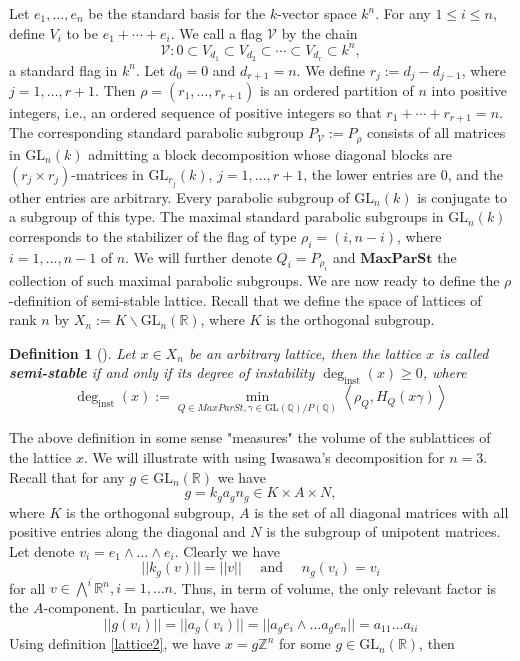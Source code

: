 \documentclass[12pt]{article} %
\newtheorem{definition}{Definition}[section]
\begin{document}
Let \( e_1, \ldots, e_n \) be the standard basis for the \( k \)-vector space \( k^n \). For any \( 1 \leq i \leq n \), define \( V_i \) to be \( e_1 + \cdots + e_i \). We call a flag \( \mathcal{V} \) by the chain
\[
    \mathcal{V}: 0 \subset V_{d_1} \subset V_{d_2} \subset \cdots \subset V_{d_r} \subset k^n,
\]
a standard flag in \( k^n \). Let \( d_0 = 0 \) and \( d_{r+1} = n \). We define \( r_j := d_j - d_{j-1} \), where \( j = 1, \ldots, r+1 \). Then \( \rho = (r_1, \ldots, r_{r+1}) \) is an ordered partition of \( n \) into positive integers, i.e., an ordered sequence of positive integers so that \( r_1 + \cdots + r_{r+1} = n \). The corresponding standard parabolic subgroup \( P_{\mathcal{V}} := P_{\rho} \) consists of all matrices in \( \text{GL}_n(k) \) admitting a block decomposition whose diagonal blocks are \( (r_j \times r_j) \)-matrices in \( \text{GL}_{r_j}(k) \), \( j = 1, \ldots, r+1 \), the lower entries are 0, and the other entries are arbitrary. Every parabolic subgroup of \( \text{GL}_n(k) \) is conjugate to a subgroup of this type.
The maximal standard parabolic subgroups in $\text{GL}_n(k)$ corresponds to the
stabilizer of the flag of type $\rho_i =(i,n-i)$, where $i = 1,\ldots,n-1$ of $n$. We will
further denote $Q_i = P_{\rho_i}$ and $\textbf{MaxParSt}$ the collection of such maximal parabolic subgroups.
We are now ready to define the $\rho$-definition of semi-stable lattice. Recall that
we define the space of lattices of rank $n$ by $X_n := K \backslash \text{GL}_n(\mathbb{R})$, where $K$ is the orthogonal subgroup.
\begin{definition}[\label  = $\rho$-definition]
    Let $x \in X_n$ be an arbitrary lattice, then the lattice $x$ is called \textbf{semi-stable} if and only if its degree of instability $\deg_{\text{inst}}(x)\ge 0$, where
    \[\deg_{\text{inst}}(x):= \min_{Q \in MaxParSt, \gamma \in \text{GL}(\mathbb{Q})/P(\mathbb{Q})}\left\langle \rho_Q, H_Q(x\gamma) \right\rangle\]
\end{definition}
The above definition in some sense "measures" the volume of the sublattices of the lattice $x$.
We will illustrate with using Iwasawa's decomposition for $n=3$. Recall that for any $g \in \text{GL}_n(\mathbb{R})$ we have
\[ g = k_ga_gn_g \in K \times A \times N,\]
where $K$ is the orthogonal subgroup, $A$ is the set of all diagonal matrices with all positive entries along the diagonal
and $N$ is the subgroup of unipotent matrices. Let denote $v_i = e_1 \wedge \ldots \wedge e_i$. Clearly we have
\[||k_g(v)|| = ||v|| \quad \text{ and } \quad n_g(v_i) =v_i\]
for all $v \in \bigwedge^i \mathbb{R}^n, i = 1,\ldots n$. Thus, in term of volume, the only
relevant factor is the $A$-component. In particular, we have
\[||g(v_i)|| =||a_g(v_i)|| = ||a_ge_i\wedge \ldots a_ge_n|| = a_{11}\ldots a_{ii} \]
Using definition \ref{lattice2}, we have $x = g\mathbb{Z}^n$ for some $g \in \text{GL}_n(\mathbb{R})$, then
\end{document}
